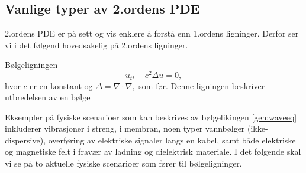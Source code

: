 \subsection{Vanlige typer av 2.ordens PDE}
2.ordens PDE er på sett og vis enklere å forstå enn 1.ordens ligninger. Derfor ser vi i det følgend hovedsakelig på 2.ordens ligninger.
\begin{eks}{Bølgeligningen}
\begin{equation}\label{gen:waveeq}
u_{tt} - c^2 \Delta u = 0,
\end{equation}
hvor \( c \) er en konstant og $\Delta=\nabla\cdot\nabla,$ som før. Denne ligningen beskriver utbredelsen av en bølge 
\end{eks}
Eksempler på fysiske scenarioer som kan beskrives av bølgelikingen \eqref{gen:waveeq} inkluderer vibrasjoner i streng, i membran, noen typer vannbølger (ikke-dispersive), overføring av elektriske signaler langs en kabel, samt både elektriske og magnetiske felt i fravær av ladning og dielektrisk materiale. I det følgende skal vi se på to aktuelle fysiske scenarioer som fører til bølgeligninger.

